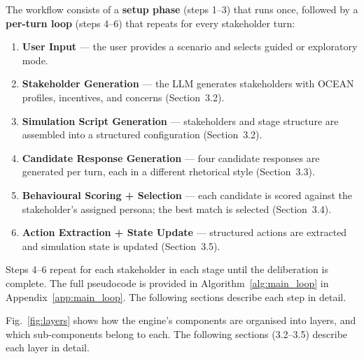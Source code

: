 \documentclass[12pt, a4paper]{report}
\begin{document}
The workflow consists of a \textbf{setup phase} (steps 1--3) that runs once, followed by a \textbf{per-turn loop} (steps 4--6) that repeats for every stakeholder turn:

\begin{enumerate}[leftmargin=*, itemsep=2pt]
    \item \textbf{User Input} --- the user provides a scenario and selects guided or exploratory mode.
    \item \textbf{Stakeholder Generation} --- the LLM generates stakeholders with OCEAN profiles, incentives, and concerns (Section~3.2).
    \item \textbf{Simulation Script Generation} --- stakeholders and stage structure are assembled into a structured configuration (Section~3.2).
    \item \textbf{Candidate Response Generation} --- four candidate responses are generated per turn, each in a different rhetorical style (Section~3.3).
    \item \textbf{Behavioural Scoring + Selection} --- each candidate is scored against the stakeholder's assigned persona; the best match is selected (Section~3.4).
    \item \textbf{Action Extraction + State Update} --- structured actions are extracted and simulation state is updated (Section~3.5).
\end{enumerate}

Steps 4--6 repeat for each stakeholder in each stage until the deliberation is complete. The full pseudocode is provided in Algorithm~\ref{alg:main_loop} in Appendix~\ref{app:main_loop}. The following sections describe each step in detail.


Fig.~\ref{fig:layers} shows how the engine's components are organised into layers, and which sub-components belong to each. The following sections (3.2--3.5) describe each layer in detail.
\end{document}
